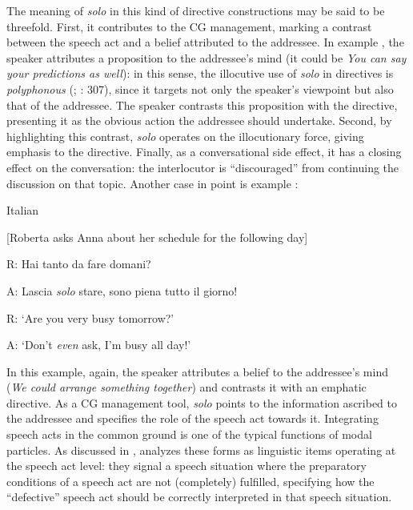 The meaning of \textit{solo} in this kind of directive constructions may be said to be threefold. First, it contributes to the CG management, marking a contrast between the speech act and a belief attributed to the addressee. In example , the speaker attributes a proposition to the addressee’s mind (it could be \textit{You can say your predictions as well}): in this sense, the illocutive use of \textit{solo} in directives is \textit{polyphonous} (\citealt{Ducrot1984}; \citealt{DetgesGévaudan2018}: 307), since it targets not only the speaker’s viewpoint but also that of the addressee. The speaker contrasts this proposition with the directive, presenting it as the obvious action the addressee should undertake. Second, by highlighting this contrast, \textit{solo} operates on the illocutionary force, giving emphasis to the directive. Finally, as a conversational side effect, it has a closing effect on the conversation: the interlocutor is “discouraged” from continuing the discussion on that topic. Another case in point is example :

\ea%
    \label{ex:key:93}

          Italian \citep[123]{Favaro2020}

[Roberta asks Anna about her schedule for the following day]

  R:  Hai tanto da fare domani?

  A:  Lascia \textit{solo} stare, sono piena tutto il giorno!

\glt
R:  ‘Are you very busy tomorrow?’

A:  ‘Don’t \textit{even} ask, I’m busy all day!’
    \z %

In this example, again, the speaker attributes a belief to the addressee’s mind (\textit{We could arrange something together}) and contrasts it with an emphatic directive. As a CG management tool, \textit{solo} points to the information ascribed to the addressee and specifies the role of the speech act towards it. Integrating speech acts in the common ground is one of the typical functions of modal particles. As discussed in , \citet{Waltereit2001,Waltereit2006} analyzes these forms as linguistic items operating at the speech act level: they signal a speech situation where the preparatory conditions of a speech act are not (completely) fulfilled, specifying how the “defective” speech act should be correctly interpreted in that speech situation.

